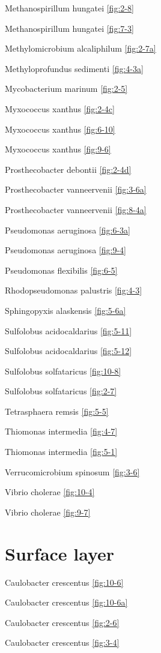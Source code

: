 \documentclass[]{tufte-book}
\begin{document}
Methanospirillum hungatei \ref{fig:2-8}

Methanospirillum hungatei \ref{fig:7-3}

Methylomicrobium alcaliphilum \ref{fig:2-7a}

Methyloprofundus sedimenti \ref{fig:4-3a}

Mycobacterium marinum \ref{fig:2-5}

Myxococcus xanthus \ref{fig:2-4c}

Myxococcus xanthus \ref{fig:6-10}

Myxococcus xanthus \ref{fig:9-6}

Prosthecobacter debontii \ref{fig:2-4d}

Prosthecobacter vanneervenii \ref{fig:3-6a}

Prosthecobacter vanneervenii \ref{fig:8-4a}

Pseudomonas aeruginosa \ref{fig:6-3a}

Pseudomonas aeruginosa \ref{fig:9-4}

Pseudomonas flexibilis \ref{fig:6-5}

Rhodopseudomonas palustris \ref{fig:4-3}

Sphingopyxis alaskensis \ref{fig:5-6a}

Sulfolobus acidocaldarius \ref{fig:5-11}

Sulfolobus acidocaldarius \ref{fig:5-12}

Sulfolobus solfataricus \ref{fig:10-8}

Sulfolobus solfataricus \ref{fig:2-7}

Tetrasphaera remsis \ref{fig:5-5}

Thiomonas intermedia \ref{fig:4-7}

Thiomonas intermedia \ref{fig:5-1}

Verrucomicrobium spinosum \ref{fig:3-6}

Vibrio cholerae \ref{fig:10-4}

Vibrio cholerae \ref{fig:9-7}

\section*{Surface layer}\label{surface-layer}

Caulobacter crescentus \ref{fig:10-6}

Caulobacter crescentus \ref{fig:10-6a}

Caulobacter crescentus \ref{fig:2-6}

Caulobacter crescentus \ref{fig:3-4}
\end{document}
